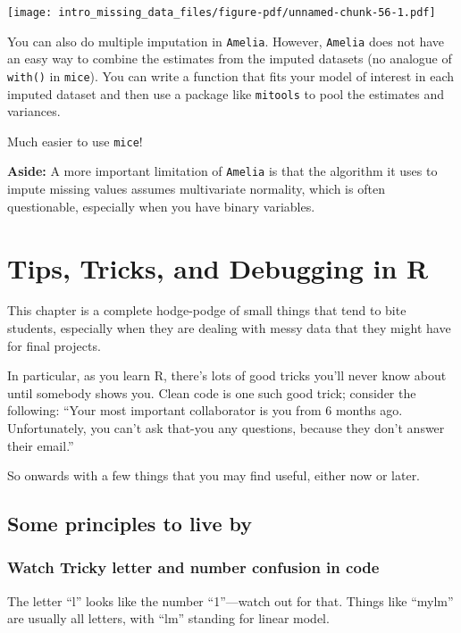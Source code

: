 \documentclass[
  letterpaper,
  DIV=11,
  numbers=noendperiod]{scrreprt}
\begin{document}
\begin{center}
\texttt{[image: intro\_missing\_data\_files/figure-pdf/unnamed-chunk-56-1.pdf]}
\end{center}

You can also do multiple imputation in \texttt{Amelia}. However,
\texttt{Amelia} does not have an easy way to combine the estimates from
the imputed datasets (no analogue of \texttt{with()} in \texttt{mice}).
You can write a function that fits your model of interest in each
imputed dataset and then use a package like \texttt{mitools} to pool the
estimates and variances.

Much easier to use \texttt{mice}!

\textbf{Aside:} A more important limitation of \texttt{Amelia} is that
the algorithm it uses to impute missing values assumes multivariate
normality, which is often questionable, especially when you have binary
variables.

\chapter{Tips, Tricks, and Debugging in
R}\label{tips-tricks-and-debugging-in-r}

This chapter is a complete hodge-podge of small things that tend to bite
students, especially when they are dealing with messy data that they
might have for final projects.

In particular, as you learn R, there's lots of good tricks you'll never
know about until somebody shows you. Clean code is one such good trick;
consider the following: ``Your most important collaborator is you from 6
months ago. Unfortunately, you can't ask that-you any questions, because
they don't answer their email.''

So onwards with a few things that you may find useful, either now or
later.

\section{Some principles to live by}\label{some-principles-to-live-by}

\subsection{Watch Tricky letter and number confusion in
code}\label{watch-tricky-letter-and-number-confusion-in-code}

The letter ``l'' looks like the number ``1''---watch out for that.
Things like ``mylm'' are usually all letters, with ``lm'' standing for
linear model.
\end{document}

